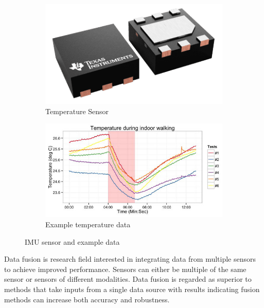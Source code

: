 \begin{figure}[!hbt]
    \centering
    \centering
    \begin{subfigure}[b]{0.45\textwidth}
        \centering
        \includegraphics[width=\textwidth]{content/2-Background/sensors/temp_sensor.png}
        \caption{Temperature Sensor\cite{TiTemperatureSensor}}
    \end{subfigure}
    \hfill
    \begin{subfigure}[b]{0.5\textwidth}
        \centering
        \includegraphics[width=\textwidth]{content/2-Background/sensors/temperature_sensor_data.jpg}
        \caption{Example temperature data\cite{Jin2014}}
    \end{subfigure}
    \caption{IMU sensor and example data}
    \label{fig:bck-temp-sensors}
\end{figure}

Data fusion is research field interested in integrating data from multiple sensors to achieve improved performance\cite{Huang2011}. Sensors can either be multiple of the same sensor\cite{Chung2019} or sensors of different modalities\cite{Huang2011}. Data fusion is regarded as superior to methods that take inputs from a single data source with results indicating fusion methods can increase both accuracy and robustness\cite{Huang2011, Liu2021}.

